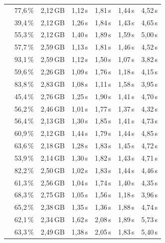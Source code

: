 \begin{table}[H]
\begin{tabularx}{\textwidth}{C C C C C C C}
                       & 77{,}6\,\% & 2{,}12\,GB & 1{,}12\,s & 1{,}81\,s & 1{,}44\,s & 4{,}52\,s \\
                       & 39{,}4\,\% & 2{,}12\,GB & 1{,}26\,s & 1{,}84\,s & 1{,}43\,s & 4{,}65\,s \\
                       & 55{,}3\,\% & 2{,}12\,GB & 1{,}40\,s & 1{,}89\,s & 1{,}59\,s & 5{,}00\,s \\
                       & 57{,}7\,\% & 2{,}59\,GB & 1{,}13\,s & 1{,}81\,s & 1{,}46\,s & 4{,}52\,s \\
                       & 93{,}1\,\% & 2{,}59\,GB & 1{,}12\,s & 1{,}50\,s & 1{,}07\,s & 3{,}82\,s \\
                       & 59{,}6\,\% & 2{,}26\,GB & 1{,}09\,s & 1{,}76\,s & 1{,}18\,s & 4{,}15\,s \\
    \addlinespace[2pt]
                      & 83{,}8\,\% & 2{,}83\,GB & 1{,}08\,s & 1{,}11\,s & 1{,}58\,s & 3{,}95\,s \\
                       & 45{,}4\,\% & 2{,}76\,GB & 1{,}25\,s & 1{,}90\,s & 1{,}41\,s & 4{,}70\,s \\
                       & 56{,}2\,\% & 2{,}46\,GB & 1{,}01\,s & 1{,}77\,s & 1{,}37\,s & 4{,}32\,s \\
                       & 56{,}4\,\% & 2{,}13\,GB & 1{,}30\,s & 1{,}85\,s & 1{,}41\,s & 4{,}73\,s \\
                       & 60{,}9\,\% & 2{,}12\,GB & 1{,}44\,s & 1{,}79\,s & 1{,}44\,s & 4{,}85\,s \\
                       & 63{,}6\,\% & 2{,}18\,GB & 1{,}28\,s & 1{,}83\,s & 1{,}45\,s & 4{,}72\,s \\
                       & 53{,}9\,\% & 2{,}14\,GB & 1{,}30\,s & 1{,}82\,s & 1{,}43\,s & 4{,}71\,s \\
                       & 82{,}2\,\% & 2{,}50\,GB & 1{,}02\,s & 1{,}83\,s & 1{,}44\,s & 4{,}46\,s \\
                       & 61{,}3\,\% & 2{,}56\,GB & 1{,}04\,s & 1{,}74\,s & 1{,}40\,s & 4{,}35\,s \\
                       & 68{,}3\,\% & 2{,}75\,GB & 1{,}05\,s & 1{,}56\,s & 1{,}18\,s & 3{,}96\,s \\
    \addlinespace[2pt]
                      & 65{,}2\,\% & 2{,}38\,GB & 1{,}35\,s & 1{,}36\,s & 1{,}88\,s & 4{,}74\,s \\
                       & 62{,}1\,\% & 2{,}34\,GB & 1{,}62\,s & 2{,}08\,s & 1{,}89\,s & 5{,}73\,s \\
                       & 63{,}3\,\% & 2{,}49\,GB & 1{,}38\,s & 2{,}05\,s & 1{,}83\,s & 5{,}40\,s \\

\end{tabularx}
\end{table}
